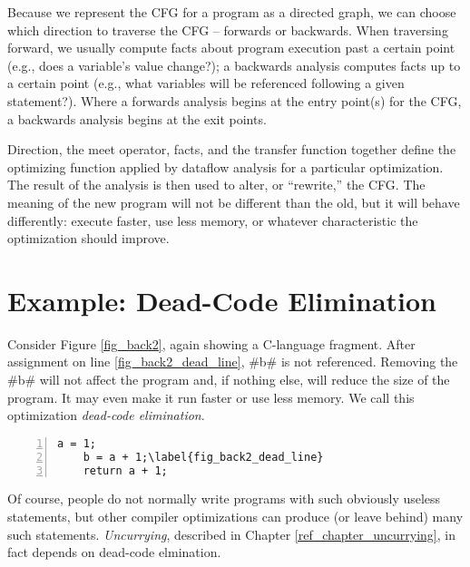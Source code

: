 \documentclass[12pt]{report}
\begin{document}
Because we represent the CFG for a program as a directed graph, we can
choose which direction to traverse the CFG -- forwards or backwards.
When traversing forward, we usually compute facts about program
execution past a certain point (e.g., does a variable's value
change?); a backwards analysis computes facts up to a certain point
(e.g., what variables will be referenced following a given
statement?). Where a forwards analysis begins at the entry point(s)
for the CFG, a backwards analysis begins at the exit points.

Direction, the meet operator, facts, and the transfer function
together define the optimizing function applied by dataflow analysis
for a particular optimization. The result of the analysis is then used
to alter, or ``rewrite,'' the CFG. The meaning of the new program will
not be different than the old, but it will behave differently: execute
faster, use less memory, or whatever characteristic the optimization
should improve.

\section{Example: Dead-Code Elimination}

Consider Figure \ref{fig_back2}, again showing a C-language fragment.
After assignment on line \ref{fig_back2_dead_line}, #b# is not
referenced. Removing the #b# will not affect the program and,
if nothing else, will reduce the size of the program. It may even make
it run faster or use less memory. We call this optimization
\emph{dead-code elimination}.

\begin{myfig}[ht]
\begin{minipage}{1in}
  \begin{Verbatim}[numbers=left,commandchars=\\\{\}]
    a = 1;
    b = a + 1;\label{fig_back2_dead_line}
    return a + 1;
  \end{Verbatim}
\end{minipage}
\caption{A C-language fragment illustrating \emph{dead code}. After
assignment on line \ref{fig_back2_dead_line}, \verb=b= is not used
and can be considered ``dead.''}
\label{fig_back2}
\end{myfig}

Of course, people do not normally write programs with such obviously
useless statements, but other compiler optimizations can produce (or
leave behind) many such statements. \emph{Uncurrying}, described in
Chapter \ref{ref_chapter_uncurrying}, in fact depends on dead-code elmination.
\end{document}
